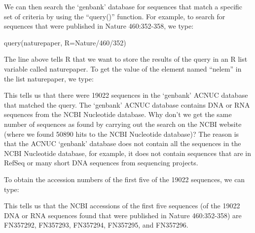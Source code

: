 \documentclass[
]{book}
\newenvironment{Shaded}{\begin{snugshade}}{\end{snugshade}}
\newcommand{\DecValTok}[1]{\textcolor[rgb]{0.00,0.00,0.81}{#1}}
\newcommand{\FunctionTok}[1]{\textcolor[rgb]{0.00,0.00,0.00}{#1}}
\newcommand{\NormalTok}[1]{#1}
\newcommand{\OtherTok}[1]{\textcolor[rgb]{0.56,0.35,0.01}{#1}}
\newcommand{\SpecialCharTok}[1]{\textcolor[rgb]{0.00,0.00,0.00}{#1}}
\newcommand{\StringTok}[1]{\textcolor[rgb]{0.31,0.60,0.02}{#1}}
\begin{document}
We can then search the `genbank' database for sequences that match a specific set of criteria by using the ``query()'' function. For example, to search for sequences that were published in Nature 460:352-358, we type:

\begin{Shaded}
\begin{Highlighting}[]
\FunctionTok{query}\NormalTok{(}\StringTok{\textquotesingle{}naturepaper\textquotesingle{}}\NormalTok{, }\StringTok{\textquotesingle{}R=Nature/460/352\textquotesingle{}}\NormalTok{)}
\end{Highlighting}
\end{Shaded}

The line above tells R that we want to store the results of the query in an R list variable called naturepaper. To get the value of the element named ``nelem'' in the list naturepaper, we type:

\begin{Shaded}
\end{Shaded}

This tells us that there were 19022 sequences in the `genbank' ACNUC database that matched the query. The `genbank' ACNUC database contains DNA or RNA sequences from the NCBI Nucleotide database. Why don't we get the same number of sequences as found by carrying out the search on the NCBI website (where we found 50890 hits to the NCBI Nucleotide database)? The reason is that the ACNUC `genbank' database does not contain all the sequences in the NCBI Nucleotide database, for example, it does not contain sequences that are in RefSeq or many short DNA sequences from sequencing projects.

To obtain the accession numbers of the first five of the 19022 sequences, we can type:

\begin{Shaded}
\end{Shaded}

This tells us that the NCBI accessions of the first five sequences (of the 19022 DNA or RNA sequences found that were published in Nature 460:352-358) are FN357292, FN357293, FN357294, FN357295, and FN357296.
\end{document}
